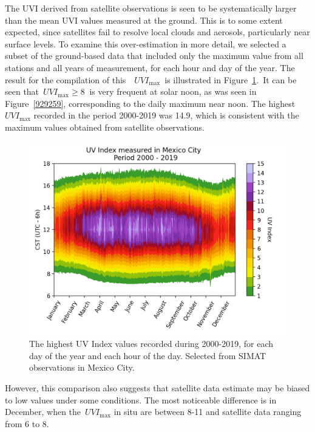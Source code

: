 \documentclass[10pt]{article}
\begin{document}
The UVI derived from satellite observations is seen to be systematically
larger than the mean UVI values measured at the ground. This is to some
extent expected, since satellites fail to resolve local clouds and
aerosols, particularly near surface levels. To examine this
over-estimation in more detail, we selected a subset of the ground-based
data that included only the maximum value from all stations and all
years of measurement, for each hour and day of the year. The result for
the compilation of this~~\(UVI_{\max}\)~is illustrated in
Figure~{\ref{931769}}.~It can be seen
that~\(UVI_{\max}\ge8\ \) is very frequent at solar noon, as was seen in
Figure~{\ref{929259}}, corresponding to the daily
maximum near noon. The highest~\(UVI_{\max}\) recorded in the period
2000-2019 was 14.9, which is consistent with the maximum values obtained
from satellite observations.
\begin{figure}[H]
\begin{center}
\includegraphics[width=0.98\columnwidth]{MaxUVindex}
\caption{{The highest UV Index values recorded during 2000-2019, for each day of
the year and each hour of the day. Selected from SIMAT observations in
Mexico City.~
{\label{931769}}%
}}
\end{center}
\end{figure}

However, this comparison also suggests that satellite data estimate may
be biased to low values under some conditions. The most noticeable
difference is in December, when the~\(UVI_{\max}\) in situ are
between 8-11 and satellite data ranging from 6 to 8.~
\end{document}
